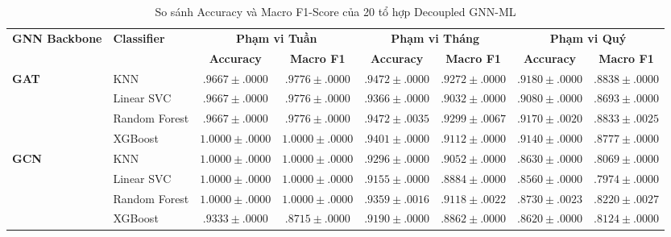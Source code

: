 \newpage
\begin{landscape}
\begin{table}[htbp]
\centering
\renewcommand{\arraystretch}{1.35}
\setlength{\tabcolsep}{8pt} %

\caption{So sánh Accuracy và Macro F1-Score của 20 tổ hợp Decoupled GNN-ML}
\label{tab:full_gnn_ml_comparison_with_std}

\begin{tabular}{llcccccc}
\toprule
\multirow{2}{*}{\textbf{GNN Backbone}} & \multirow{2}{*}{\textbf{Classifier}}
& \multicolumn{2}{c}{\textbf{Phạm vi Tuần}}
& \multicolumn{2}{c}{\textbf{Phạm vi Tháng}}
& \multicolumn{2}{c}{\textbf{Phạm vi Quý}} \\
\cmidrule(lr){3-4} \cmidrule(lr){5-6} \cmidrule(lr){7-8}
 & & \textbf{Accuracy} & \textbf{Macro F1} & \textbf{Accuracy} & \textbf{Macro F1} & \textbf{Accuracy} & \textbf{Macro F1} \\
\midrule

\multirow{4}{*}{\textbf{GAT}}
& KNN            & $.9667 \pm .0000$ & $.9776 \pm .0000$ 
                 & $.9472 \pm .0000$ & $.9272 \pm .0000$ 
                 & $.9180 \pm .0000$ & $.8838 \pm .0000$ \\
& Linear SVC     & $.9667 \pm .0000$ & $.9776 \pm .0000$ 
                 & $.9366 \pm .0000$ & $.9032 \pm .0000$ 
                 & $.9080 \pm .0000$ & $.8693 \pm .0000$ \\
& Random Forest  & $.9667 \pm .0000$ & $.9776 \pm .0000$ 
                 & $\mathbf{.9472 \pm .0035}$ & $\mathbf{.9299 \pm .0067}$ 
                 & $\mathbf{.9170 \pm .0020}$ & $\mathbf{.8833 \pm .0025}$ \\
& XGBoost        & $1.0000 \pm .0000$ & $1.0000 \pm .0000$ 
                 & $.9401 \pm .0000$ & $.9112 \pm .0000$ 
                 & $.9140 \pm .0000$ & $.8777 \pm .0000$ \\
\midrule

\multirow{4}{*}{\textbf{GCN}}
& KNN            & $1.0000 \pm .0000$ & $1.0000 \pm .0000$ 
                 & $.9296 \pm .0000$ & $.9052 \pm .0000$ 
                 & $.8630 \pm .0000$ & $.8069 \pm .0000$ \\
& Linear SVC     & $1.0000 \pm .0000$ & $1.0000 \pm .0000$ 
                 & $.9155 \pm .0000$ & $.8884 \pm .0000$ 
                 & $.8560 \pm .0000$ & $.7974 \pm .0000$ \\
& Random Forest  & $1.0000 \pm .0000$ & $1.0000 \pm .0000$ 
                 & $.9359 \pm .0016$ & $.9118 \pm .0022$ 
                 & $.8730 \pm .0023$ & $.8220 \pm .0027$ \\
& XGBoost        & $.9333 \pm .0000$ & $.8715 \pm .0000$ 
                 & $.9190 \pm .0000$ & $.8862 \pm .0000$ 
                 & $.8620 \pm .0000$ & $.8124 \pm .0000$ \\
\midrule


\end{tabular}
\end{table}
\end{landscape}
